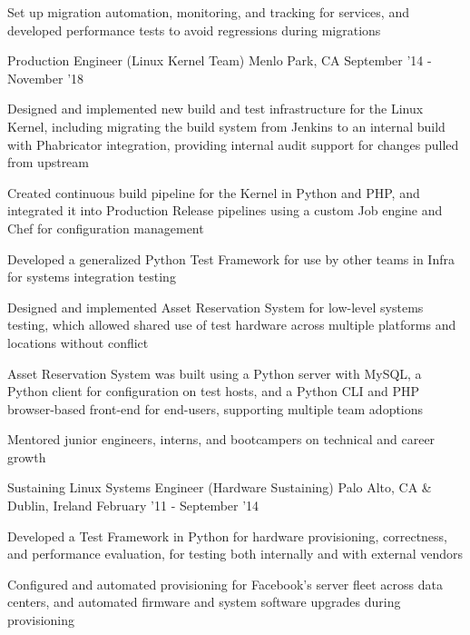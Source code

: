 \begin{cventries}
{\begin{cvitems}
		  \item Set up migration automation, monitoring, and tracking for services, and developed performance tests to avoid regressions during migrations
        \end{cvitems}
    }
\vspace{0mm}
\cventry
	{Production Engineer \color{solarized-orange}(Linux Kernel Team)} %
    {} %
    {Menlo Park, CA} %
    {September '14 - November '18} %
    {
        \begin{cvitems}
		  \item Designed and implemented new build and test infrastructure for the Linux Kernel, including migrating the build system from Jenkins to an internal build with Phabricator integration, providing internal audit support for changes pulled from upstream
		  \item Created continuous build pipeline for the Kernel in Python and PHP, and integrated it into Production Release pipelines using a custom Job engine and Chef for configuration management
		  \item Developed a generalized Python Test Framework for use by other teams in Infra for systems integration testing
		  \item Designed and implemented Asset Reservation System for low-level systems testing, which allowed shared use of test hardware across multiple platforms and locations without conflict
		  \item Asset Reservation System was built using a Python server with MySQL, a Python client for configuration on test hosts, and a Python CLI and PHP browser-based front-end for end-users, supporting multiple team adoptions
          \item Mentored junior engineers, interns, and bootcampers on technical and career growth
        \end{cvitems}
    }
\vspace{0mm}
\cventry
	{Sustaining Linux Systems Engineer \color{solarized-orange}(Hardware Sustaining)} %
    {} %
	{Palo Alto, CA \& Dublin, Ireland} %
    {February '11 - September '14} %
    {
        \begin{cvitems}
		  \item Developed a Test Framework in Python for hardware provisioning, correctness, and performance evaluation, for testing both internally and with external vendors
		  \item Configured and automated provisioning for Facebook's server fleet across data centers, and automated firmware and system software upgrades during provisioning

\end{cvitems}}
\end{cventries}
